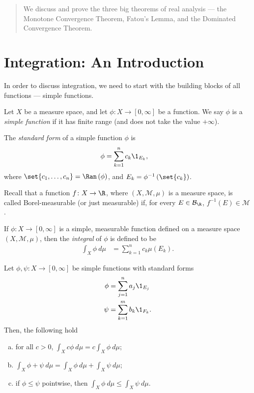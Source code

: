 \documentclass[12pt]{mypackage}
\begin{document}
\RaggedRight
\begin{abstract}
  \noindent We discuss and prove the three big theorems of real analysis --- the Monotone Convergence Theorem, Fatou's Lemma, and the Dominated Convergence Theorem.
\end{abstract}
\section{Integration: An Introduction}%
In order to discuss integration, we need to start with the building blocks of all functions --- simple functions.
\begin{definition}
  Let $X$ be a measure space, and let $\phi\colon X\rightarrow [0,\infty]$ be a function. We say $\phi$ is a \textit{simple function} if it has finite range (and does not take the value $+\infty$).\newline

  The \textit{standard form} of a simple function $\phi$ is
  \begin{align*}
    \phi &= \sum_{k=1}^{n} c_k\1_{E_k},
  \end{align*}
  where $\set{c_1,\dots,c_n} = \Ran\left( \phi \right)$, and $E_k = \phi^{-1}\left( \set{c_k} \right)$.
\end{definition}
Recall that a function $f\colon X\rightarrow \R$, where $\left( X,\mathcal{M},\mu \right)$ is a measure space, is called Borel-measurable (or just measurable) if, for every $E\in \mathcal{B}_{\R}$, $f^{-1}\left( E \right)\in \mathcal{M}$.
\begin{definition}
  If $\phi\colon X\rightarrow [0,\infty]$ is a simple, measurable function defined on a measure space $\left( X,\mathcal{M},\mu \right)$, then the \textit{integral} of $\phi$ is defined to be
  \begin{align*}
    \int_{X}^{} \phi\:d\mu &= \sum_{k=1}^{n}c_k\mu\left( E_k \right).\label{eq:integral_simple_function}\tag{$\dag$}
  \end{align*}
\end{definition}
\begin{proposition}
  Let $\phi,\psi\colon X\rightarrow [0,\infty]$ be simple functions with standard forms
  \begin{align*}
    \phi &= \sum_{j=1}^{n}a_j\1_{E_j}\\
    \psi &= \sum_{k=1}^{m} b_k\1_{F_k}.
  \end{align*}
  Then, the following hold
  \begin{enumerate}[(a)]
    \item for all $c> 0$, $\displaystyle \int_{X}^{} c\phi\:d\mu = c \int_{X}^{} \phi\:d\mu$;
    \item $\displaystyle \int_{X}^{} \phi + \psi\:d\mu = \int_{X}^{} \phi\:d\mu + \int_{X}^{} \psi\:d\mu$;
    \item if $\phi\leq \psi$ pointwise, then $\displaystyle \int_{X}^{} \phi\:d\mu \leq \int_{X}^{} \psi\:d\mu$.
  \end{enumerate}
\end{proposition}
\end{document}
